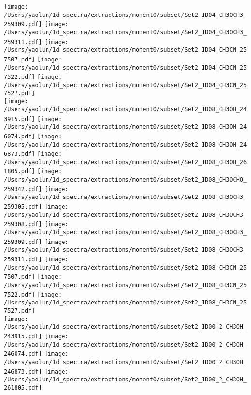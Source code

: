 \begin{figure*}[htbp!]
  \texttt{[image: /Users/yaolun/1d\_spectra/extractions/moment0/subset/Set2\_ID04\_CH3OCH3\_259309.pdf]}
  \texttt{[image: /Users/yaolun/1d\_spectra/extractions/moment0/subset/Set2\_ID04\_CH3OCH3\_259311.pdf]}
  \texttt{[image: /Users/yaolun/1d\_spectra/extractions/moment0/subset/Set2\_ID04\_CH3CN\_257507.pdf]}
  \texttt{[image: /Users/yaolun/1d\_spectra/extractions/moment0/subset/Set2\_ID04\_CH3CN\_257522.pdf]}
  \texttt{[image: /Users/yaolun/1d\_spectra/extractions/moment0/subset/Set2\_ID04\_CH3CN\_257527.pdf]}
  \\
  \texttt{[image: /Users/yaolun/1d\_spectra/extractions/moment0/subset/Set2\_ID08\_CH3OH\_243915.pdf]}
  \texttt{[image: /Users/yaolun/1d\_spectra/extractions/moment0/subset/Set2\_ID08\_CH3OH\_246074.pdf]}
  \texttt{[image: /Users/yaolun/1d\_spectra/extractions/moment0/subset/Set2\_ID08\_CH3OH\_246873.pdf]}
  \texttt{[image: /Users/yaolun/1d\_spectra/extractions/moment0/subset/Set2\_ID08\_CH3OH\_261805.pdf]}
  \texttt{[image: /Users/yaolun/1d\_spectra/extractions/moment0/subset/Set2\_ID08\_CH3OCHO\_259342.pdf]}
  \texttt{[image: /Users/yaolun/1d\_spectra/extractions/moment0/subset/Set2\_ID08\_CH3OCH3\_259305.pdf]}
  \texttt{[image: /Users/yaolun/1d\_spectra/extractions/moment0/subset/Set2\_ID08\_CH3OCH3\_259308.pdf]}
  \texttt{[image: /Users/yaolun/1d\_spectra/extractions/moment0/subset/Set2\_ID08\_CH3OCH3\_259309.pdf]}
  \texttt{[image: /Users/yaolun/1d\_spectra/extractions/moment0/subset/Set2\_ID08\_CH3OCH3\_259311.pdf]}
  \texttt{[image: /Users/yaolun/1d\_spectra/extractions/moment0/subset/Set2\_ID08\_CH3CN\_257507.pdf]}
  \texttt{[image: /Users/yaolun/1d\_spectra/extractions/moment0/subset/Set2\_ID08\_CH3CN\_257522.pdf]}
  \texttt{[image: /Users/yaolun/1d\_spectra/extractions/moment0/subset/Set2\_ID08\_CH3CN\_257527.pdf]}
  \\
  \texttt{[image: /Users/yaolun/1d\_spectra/extractions/moment0/subset/Set2\_ID00\_2\_CH3OH\_243915.pdf]}
  \texttt{[image: /Users/yaolun/1d\_spectra/extractions/moment0/subset/Set2\_ID00\_2\_CH3OH\_246074.pdf]}
  \texttt{[image: /Users/yaolun/1d\_spectra/extractions/moment0/subset/Set2\_ID00\_2\_CH3OH\_246873.pdf]}
  \texttt{[image: /Users/yaolun/1d\_spectra/extractions/moment0/subset/Set2\_ID00\_2\_CH3OH\_261805.pdf]}

\end{figure*}

